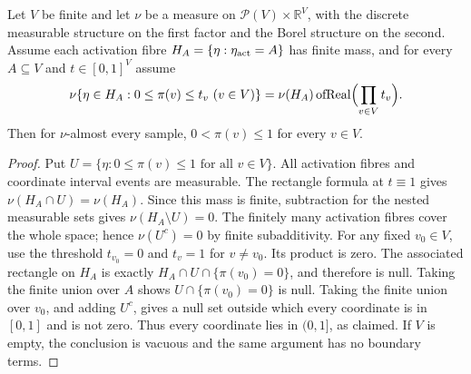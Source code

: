 \begin{helper}
Let $V$ be finite and let $\nu$ be a measure on
$\mathcal P(V)\times\mathbb R^V$, with the discrete measurable structure
on the first factor and the Borel structure on the second.
Assume each activation fibre $H_A=\{\eta:\eta_{\rm act}=A\}$ has finite
mass, and for every $A\subseteq V$ and $t\in[0,1]^V$ assume
\[
 \nu\{\eta\in H_A:0\le\pi(v)\le t_v\ (v\in V)\}
 =\nu(H_A)\operatorname{ofReal}\Bigl(\prod_{v\in V}t_v\Bigr).
\]
Then for $\nu$-almost every sample, $0<\pi(v)\le1$ for every $v\in V$.
\end{helper}
\begin{proof}
Put $U=\{\eta:0\le\pi(v)\le1\text{ for all }v\in V\}$.
All activation fibres and coordinate interval events are measurable.
The rectangle formula at $t\equiv1$ gives
$\nu(H_A\cap U)=\nu(H_A)$. Since this mass is finite, subtraction for
the nested measurable sets gives $\nu(H_A\setminus U)=0$.
The finitely many activation fibres cover the whole space; hence
$\nu(U^c)=0$ by finite subadditivity.
For any fixed $v_0\in V$, use the threshold $t_{v_0}=0$ and $t_v=1$
for $v\ne v_0$. Its product is zero. The associated rectangle on $H_A$
is exactly $H_A\cap U\cap\{\pi(v_0)=0\}$, and therefore is null.
Taking the finite union over $A$ shows $U\cap\{\pi(v_0)=0\}$ is null.
Taking the finite union over $v_0$, and adding $U^c$, gives a null set
outside which every coordinate is in $[0,1]$ and is not zero.
Thus every coordinate lies in $(0,1]$, as claimed. If $V$ is empty,
the conclusion is vacuous and the same argument has no boundary terms.
\end{proof}
